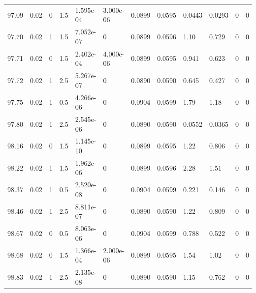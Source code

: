 \documentclass[preview]{standalone}
\begin{document}
{{{{{{{{{{{{{{{{{{{\begin{tabular}{L{1.2cm}C{1.2cm} C{0.3cm}C{0.5cm} C{1.4cm}C{1.4cm} C{1.4cm}C{1.4cm} C{1.6cm}C{1.6cm} C{1.6cm}C{1.6cm}}
  97.09  &  0.02  & 0     & 1.5 &  1.595e-04  & 3.000e-06  &  0.0899&   0.0595& 0.0443 & 0.0293   &  0 & 0  \\ 
  97.70  &  0.02  & 1     & 1.5 &  7.052e-07  & 0  &  0.0899&   0.0596& 1.10 & 0.729   &  0 & 0  \\ 
  97.71  &  0.02  & 0     & 1.5 &  2.402e-04  & 4.000e-06  &  0.0899&   0.0595& 0.941 & 0.623   &  0 & 0  \\ 
  97.72  &  0.02  & 1     & 2.5 &  5.267e-07  & 0  &  0.0890&   0.0590& 0.645 & 0.427   &  0 & 0  \\ 
  97.75  &  0.02  & 1     & 0.5 &  4.266e-06  & 0  &  0.0904&   0.0599& 1.79 & 1.18   &  0 & 0  \\ 
  97.80  &  0.02  & 1     & 2.5 &  2.545e-06  & 0  &  0.0890&   0.0590& 0.0552 & 0.0365   &  0 & 0  \\ 
  98.16  &  0.02  & 0     & 1.5 &  1.145e-10  & 0  &  0.0899&   0.0595& 1.22 & 0.806   &  0 & 0  \\ 
  98.22  &  0.02  & 1     & 1.5 &  1.962e-06  & 0  &  0.0899&   0.0596& 2.28 & 1.51   &  0 & 0  \\ 
  98.37  &  0.02  & 1     & 0.5 &  2.520e-08  & 0  &  0.0904&   0.0599& 0.221 & 0.146   &  0 & 0  \\ 
  98.46  &  0.02  & 1     & 2.5 &  8.811e-07  & 0  &  0.0890&   0.0590& 1.22 & 0.809   &  0 & 0  \\ 
  98.67  &  0.02  & 0     & 0.5 &  8.063e-06  & 0  &  0.0904&   0.0599& 0.788 & 0.522   &  0 & 0  \\ 
  98.68  &  0.02  & 0     & 1.5 &  1.366e-04  & 2.000e-06  &  0.0899&   0.0595& 1.54 & 1.02   &  0 & 0  \\ 
  98.83  &  0.02  & 1     & 2.5 &  2.135e-08  & 0  &  0.0890&   0.0590& 1.15 & 0.762   &  0 & 0  \\ 
\hline 
\end{tabular} 

}}}}}}}}}}}}}}}}}}}
\end{document}
